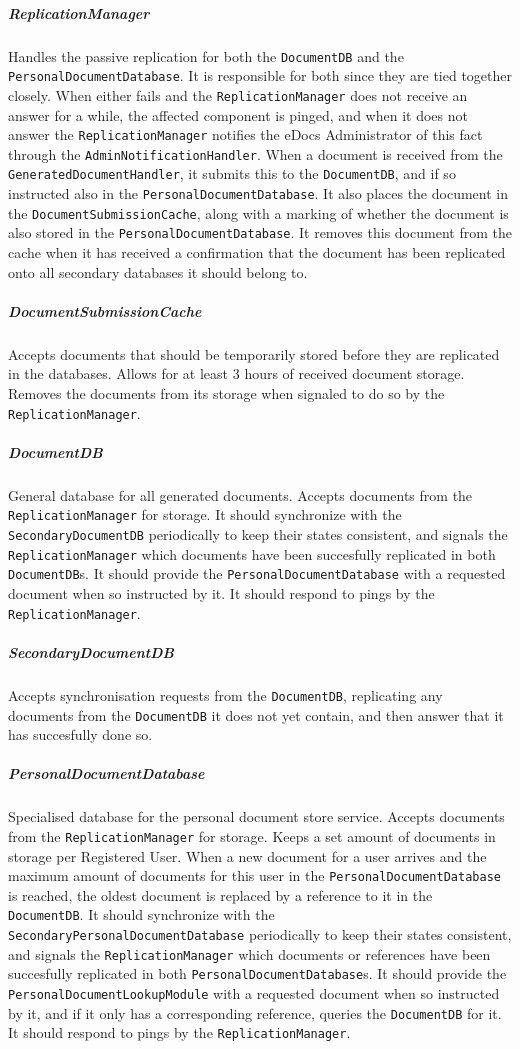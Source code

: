 \documentclass[a4paper,10pt]{article}
\begin{document}
\subparagraph{ReplicationManager}
Handles the passive replication for both the \texttt{DocumentDB} and the \texttt{PersonalDocumentDatabase}. It is responsible for both since they are tied together closely. When either fails and the \texttt{ReplicationManager} does not receive an answer for a while, the affected component is pinged, and when it does not answer the \texttt{ReplicationManager} notifies the eDocs Administrator of this fact through the \texttt{AdminNotificationHandler}. When a document is received from the \texttt{GeneratedDocumentHandler}, it submits this to the \texttt{DocumentDB}, and if so instructed also in the \texttt{PersonalDocumentDatabase}. It also places the document in the \texttt{DocumentSubmissionCache}, along with a marking of whether the document is also stored in the \texttt{PersonalDocumentDatabase}. It removes this document from the cache when it has received a confirmation that the document has been replicated onto all secondary databases it should belong to.

\subparagraph{DocumentSubmissionCache}
Accepts documents that should be temporarily stored before they are replicated in the databases. Allows for at least 3 hours of received document storage. Removes the documents from its storage when signaled to do so by the \texttt{ReplicationManager}.

\subparagraph{DocumentDB}
General database for all generated documents. Accepts documents from the \texttt{ReplicationManager} for storage. It should synchronize with the \texttt{SecondaryDocumentDB} periodically to keep their states consistent, and signals the \texttt{ReplicationManager} which documents have been succesfully replicated in both \texttt{DocumentDB}s. It should provide the \texttt{PersonalDocumentDatabase} with a requested document when so instructed by it. It should respond to pings by the \texttt{ReplicationManager}.

\subparagraph{SecondaryDocumentDB}
Accepts synchronisation requests from the \texttt{DocumentDB}, replicating any documents from the \texttt{DocumentDB} it does not yet contain, and then answer that it has succesfully done so.

\subparagraph{PersonalDocumentDatabase}
Specialised database for the personal document store service. Accepts documents from the \texttt{ReplicationManager} for storage. Keeps a set amount of documents in storage per Registered User. When a new document for a user arrives and the maximum amount of documents for this user in the \texttt{PersonalDocumentDatabase} is reached, the oldest document is replaced by a reference to it in the \texttt{DocumentDB}. It should synchronize with the \texttt{SecondaryPersonalDocumentDatabase} periodically to keep their states consistent, and signals the \texttt{ReplicationManager} which documents or references have been succesfully replicated in both \texttt{PersonalDocumentDatabase}s. It should provide the \texttt{PersonalDocumentLookupModule} with a requested document when so instructed by it, and if it only has a corresponding reference, queries the \texttt{DocumentDB} for it. It should respond to pings by the \texttt{ReplicationManager}.
\end{document}
